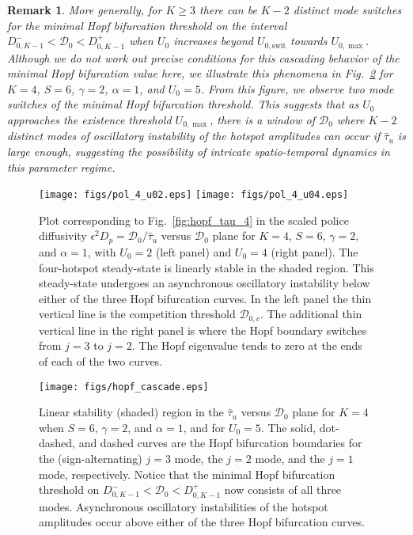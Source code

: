 \documentclass{article}%
\newtheorem{rem}[theorem]{Remark}
\begin{document}
\begin{rem}
More generally, for $K\geq 3$ there can be $K-2$ distinct mode
switches for the minimal Hopf bifurcation threshold on the interval
$D^{-}_{0,K-1}<{\mathcal D}_0<D^{+}_{0,K-1}$ when $U_0$ increases
beyond $U_{0,\textrm{swit}}$ towards $U_{0,\max}$. Although we do not
work out precise conditions for this {\em cascading behavior} of the
minimal Hopf bifurcation value here, we illustrate this phenomena in
Fig.~\ref{fig:cascade} for $K=4$, $S=6$, $\gamma=2$, $\alpha=1$, and
$U_0=5$. From this figure, we observe two mode switches of the minimal
Hopf bifurcation threshold. This suggests that as $U_0$ approaches the
existence threshold $U_{0,\max}$, there is a window of ${\mathcal
  D}_0$ where $K-2$ distinct modes of oscillatory instability of the
hotspot amplitudes can occur if $\hat{\tau}_u$ is large enough,
suggesting the possibility of intricate spatio-temporal dynamics in
this parameter regime.
\end{rem}

\begin{figure}[htbp]
\centering
\texttt{[image: figs/pol\_4\_u02.eps]}
\texttt{[image: figs/pol\_4\_u04.eps]}
\caption{\label{fig:hopf_pol_4} Plot corresponding to
  Fig.~\ref{fig:hopf_tau_4} in the scaled police diffusivity
  $\epsilon^{2}D_p={{\mathcal D}_0/\hat{\tau}_u}$ versus ${\mathcal
    D}_0$ plane for $K=4$, $S=6$, $\gamma=2$, and $\alpha=1$, with
  $U_0=2$ (left panel) and $U_{0}=4$ (right panel). The four-hotspot
  steady-state is linearly stable in the shaded region. This
  steady-state undergoes an asynchronous oscillatory instability below
  either of the three Hopf bifurcation curves.  In the left panel the
  thin vertical line is the competition threshold ${\mathcal
    D}_{0,c}$. The additional thin vertical line in the right panel is
  where the Hopf boundary switches from $j=3$ to $j=2$. The Hopf
  eigenvalue tends to zero at the ends of each of the two curves.}
\end{figure}

\begin{figure}[htbp]
\centering
\texttt{[image: figs/hopf\_cascade.eps]}
\caption{\label{fig:cascade} Linear stability (shaded) region in the
  $\hat{\tau}_u$ versus ${\mathcal D}_0$ plane for $K=4$ when $S=6$,
  $\gamma=2$, and $\alpha=1$, and for $U_0=5$. The solid, dot-dashed,
  and dashed curves are the Hopf bifurcation boundaries for the
  (sign-alternating) $j=3$ mode, the $j=2$ mode, and the $j=1$ mode,
  respectively. Notice that the minimal Hopf bifurcation threshold on
  $D^{-}_{0,K-1}<{\mathcal D}_0<D^{+}_{0,K-1}$ now consists of all
  three modes. Asynchronous oscillatory instabilities of the hotspot
  amplitudes occur above either of the three Hopf bifurcation curves.}
\end{figure}
\end{document}

